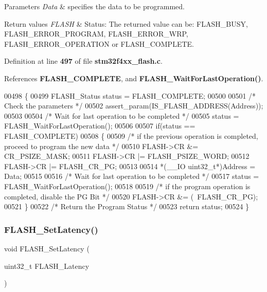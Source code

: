 \begin{DoxyParams}{Parameters}
{\em Data} & specifies the data to be programmed. \\
\hline
\end{DoxyParams}

\begin{DoxyRetVals}{Return values}
{\em F\+L\+A\+SH} & Status\+: The returned value can be\+: F\+L\+A\+S\+H\+\_\+\+B\+U\+SY, F\+L\+A\+S\+H\+\_\+\+E\+R\+R\+O\+R\+\_\+\+P\+R\+O\+G\+R\+AM, F\+L\+A\+S\+H\+\_\+\+E\+R\+R\+O\+R\+\_\+\+W\+RP, F\+L\+A\+S\+H\+\_\+\+E\+R\+R\+O\+R\+\_\+\+O\+P\+E\+R\+A\+T\+I\+ON or F\+L\+A\+S\+H\+\_\+\+C\+O\+M\+P\+L\+E\+TE. \\
\hline
\end{DoxyRetVals}


Definition at line \textbf{ 497} of file \textbf{ stm32f4xx\+\_\+flash.\+c}.



References \textbf{ F\+L\+A\+S\+H\+\_\+\+C\+O\+M\+P\+L\+E\+TE}, and \textbf{ F\+L\+A\+S\+H\+\_\+\+Wait\+For\+Last\+Operation()}.


\begin{DoxyCode}
00498 \{
00499   FLASH_Status status = FLASH_COMPLETE;
00500 
00501   \textcolor{comment}{/* Check the parameters */}
00502   assert_param(IS_FLASH_ADDRESS(Address));
00503 
00504   \textcolor{comment}{/* Wait for last operation to be completed */}
00505   status = FLASH_WaitForLastOperation();
00506   
00507   \textcolor{keywordflow}{if}(status == FLASH_COMPLETE)
00508   \{
00509     \textcolor{comment}{/* if the previous operation is completed, proceed to program the new data */}
00510     FLASH->CR &= CR_PSIZE_MASK;
00511     FLASH->CR |= FLASH_PSIZE_WORD;
00512     FLASH->CR |= FLASH_CR_PG;
00513   
00514     *(\_\_IO uint32\_t*)Address = Data;
00515         
00516     \textcolor{comment}{/* Wait for last operation to be completed */}
00517     status = FLASH_WaitForLastOperation();
00518 
00519     \textcolor{comment}{/* if the program operation is completed, disable the PG Bit */}
00520     FLASH->CR &= (~FLASH_CR_PG);
00521   \} 
00522   \textcolor{comment}{/* Return the Program Status */}
00523   \textcolor{keywordflow}{return} status;
00524 \}
\end{DoxyCode}
\mbox{\label{group__FLASH_ga54bcb96270215c752c3479c8c9e438c0}} 
\subsubsection{F\+L\+A\+S\+H\+\_\+\+Set\+Latency()}
{\footnotesize\ttfamily void F\+L\+A\+S\+H\+\_\+\+Set\+Latency (\begin{DoxyParamCaption}\item[{uint32\+\_\+t}]{F\+L\+A\+S\+H\+\_\+\+Latency }\end{DoxyParamCaption})}



